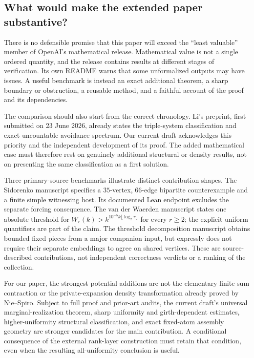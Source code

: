 
\subsection{What would make the extended paper substantive?}

There is no defensible promise that this paper will exceed the ``least
valuable'' member of OpenAI's mathematical release.  Mathematical value is
not a single ordered quantity, and the release contains results at different
stages of verification.  Its own README warns that some unformalized outputs
may have issues.  A useful benchmark is instead an exact additional theorem,
a sharp boundary or obstruction, a reusable method, and a faithful account
of the proof and its dependencies.

The comparison should also start from the correct chronology.  Li's preprint,
first submitted on 23 June 2026, already states the triple-system
classification and exact uncountable avoidance spectrum.  Our current
draft acknowledges this priority and the independent development of its
proof.  The added mathematical case must therefore rest on genuinely
additional structural or density results, not on presenting the same
classification as a first solution.

Three primary-source benchmarks illustrate distinct contribution shapes.
The Sidorenko manuscript specifies a $35$-vertex, $66$-edge bipartite
counterexample and a finite simple witnessing host.  Its documented Lean
endpoint excludes the separate forcing consequence.  The van der Waerden
manuscript states one absolute threshold for
$W_r(k)>k^{10^{-5}k\lfloor\log_2r\rfloor}$ for every $r\ge2$;
the explicit uniform quantifiers are part of the claim.  The threshold
decomposition manuscript obtains bounded fixed pieces from a major
companion input, but expressly does not require their separate embeddings
to agree on shared vertices.  These are source-described contributions,
not independent correctness verdicts or a ranking of the collection.

For our paper, the strongest potential additions are not the elementary
finite-sum contraction or the private-expansion density transformation
already proved by Nie--Spiro.  Subject to full proof and prior-art audits,
the current draft's universal marginal-realization theorem, sharp
uniformity and girth-dependent estimates, higher-uniformity structural
classification, and exact fixed-atom assembly geometry are stronger
candidates for the main contribution.  A conditional consequence of the
external rank-layer construction must retain that condition, even when
the resulting all-uniformity conclusion is useful.

